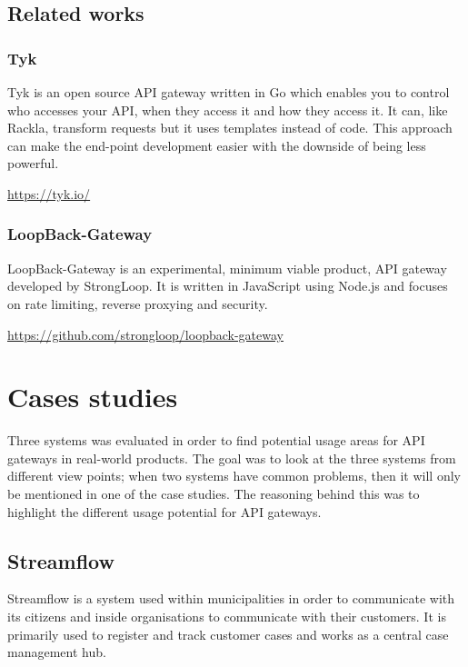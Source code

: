 \documentclass{cslthse-msc}
\begin{document}
\section{Related works}
\subsection{Tyk}

Tyk is an open source API gateway written in Go which enables you to control who accesses your API, when they access it and how they access it. It can, like Rackla, transform requests but it uses templates instead of code. This approach can make the end-point development easier with the downside of being less powerful.

\vspace{5mm}

\noindent \url{https://tyk.io/}

\subsection{LoopBack-Gateway}

LoopBack-Gateway is an experimental, minimum viable product, API gateway developed by StrongLoop. It is written in JavaScript using Node.js and focuses on rate limiting, reverse proxying and security.

\vspace{5mm}

\noindent \url{https://github.com/strongloop/loopback-gateway}

\chapter{Cases studies}

Three systems was evaluated in order to find potential usage areas for API gateways in real-world products. The goal was to look at the three systems from different view points; when two systems have common problems, then it will only be mentioned in one of the case studies. The reasoning behind this was to highlight the different usage potential for API gateways.

\section{Streamflow}
Streamflow\cite{streamflow} is a system used within municipalities in order to communicate with its citizens and inside organisations to communicate with their customers. It is primarily used to register and track customer cases and works as a central case management hub.
\end{document}
